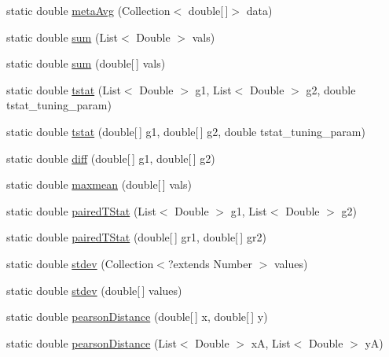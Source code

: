 \begin{DoxyCompactItemize}
\item 
static double \hyperlink{classbroad_1_1core_1_1math_1_1_statistics_a91a5391560b7344a6706d10be8284522}{meta\+Avg} (Collection$<$ double\mbox{[}$\,$\mbox{]}$>$ data)
\item 
static double \hyperlink{classbroad_1_1core_1_1math_1_1_statistics_a6dcc264a15a5594dcec0c6a75cdb3d53}{sum} (List$<$ Double $>$ vals)
\item 
static double \hyperlink{classbroad_1_1core_1_1math_1_1_statistics_a7d4868e44ea8b863197f0324d9aac76b}{sum} (double\mbox{[}$\,$\mbox{]} vals)
\item 
static double \hyperlink{classbroad_1_1core_1_1math_1_1_statistics_aa04be850e7819ed48cd040f23a3f226b}{tstat} (List$<$ Double $>$ g1, List$<$ Double $>$ g2, double tstat\+\_\+tuning\+\_\+param)
\item 
static double \hyperlink{classbroad_1_1core_1_1math_1_1_statistics_a2f1f2961416dc3216333b20efe79952f}{tstat} (double\mbox{[}$\,$\mbox{]} g1, double\mbox{[}$\,$\mbox{]} g2, double tstat\+\_\+tuning\+\_\+param)
\item 
static double \hyperlink{classbroad_1_1core_1_1math_1_1_statistics_a306b496af01088772c65c218ea8ef93b}{diff} (double\mbox{[}$\,$\mbox{]} g1, double\mbox{[}$\,$\mbox{]} g2)
\item 
static double \hyperlink{classbroad_1_1core_1_1math_1_1_statistics_a9129c80b84cba2df7c06ad61090df866}{maxmean} (double\mbox{[}$\,$\mbox{]} vals)
\item 
static double \hyperlink{classbroad_1_1core_1_1math_1_1_statistics_aba03c6f27b8787c87628d23289de335e}{paired\+T\+Stat} (List$<$ Double $>$ g1, List$<$ Double $>$ g2)
\item 
static double \hyperlink{classbroad_1_1core_1_1math_1_1_statistics_a83cef127dbfc5c6dde478aa12d24c2fd}{paired\+T\+Stat} (double\mbox{[}$\,$\mbox{]} gr1, double\mbox{[}$\,$\mbox{]} gr2)
\item 
static double \hyperlink{classbroad_1_1core_1_1math_1_1_statistics_abc4dd8ce6829f120079b83b87a1be301}{stdev} (Collection$<$?extends Number $>$ values)
\item 
static double \hyperlink{classbroad_1_1core_1_1math_1_1_statistics_a8fea64d9e2037189d8345cdcf9dcbbe5}{stdev} (double\mbox{[}$\,$\mbox{]} values)
\item 
static double \hyperlink{classbroad_1_1core_1_1math_1_1_statistics_a0ed3f88c0ff0c9f156001d2904ae64a6}{pearson\+Distance} (double\mbox{[}$\,$\mbox{]} x, double\mbox{[}$\,$\mbox{]} y)
\item 
static double \hyperlink{classbroad_1_1core_1_1math_1_1_statistics_adbef20038ecb5834a8f9ae8486a508d4}{pearson\+Distance} (List$<$ Double $>$ x\+A, List$<$ Double $>$ y\+A)

\end{DoxyCompactItemize}
